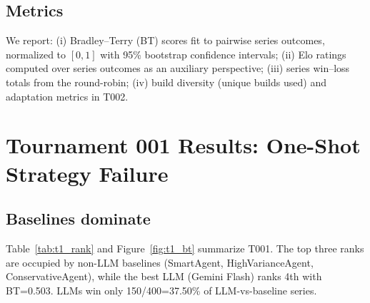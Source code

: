 \documentclass[11pt]{article}
\newcommand{\tOne}{T001}
\newcommand{\tTwo}{T002}
\begin{document}
\subsection{Metrics}

We report:
(i) Bradley--Terry (BT) scores fit to pairwise series outcomes, normalized to $[0,1]$ with 95\% bootstrap confidence intervals;
(ii) Elo ratings computed over series outcomes as an auxiliary perspective;
(iii) series win--loss totals from the round-robin;
(iv) build diversity (unique builds used) and adaptation metrics in \tTwo.

\section{Tournament 001 Results: One-Shot Strategy Failure}

\subsection{Baselines dominate}

Table~\ref{tab:t1_rank} and Figure~\ref{fig:t1_bt} summarize \tOne.
The top three ranks are occupied by non-LLM baselines (SmartAgent, HighVarianceAgent, ConservativeAgent), while the best LLM (Gemini Flash) ranks 4th with BT=0.503.
LLMs win only 150/400=37.50\% of LLM-vs-baseline series.
\end{document}
